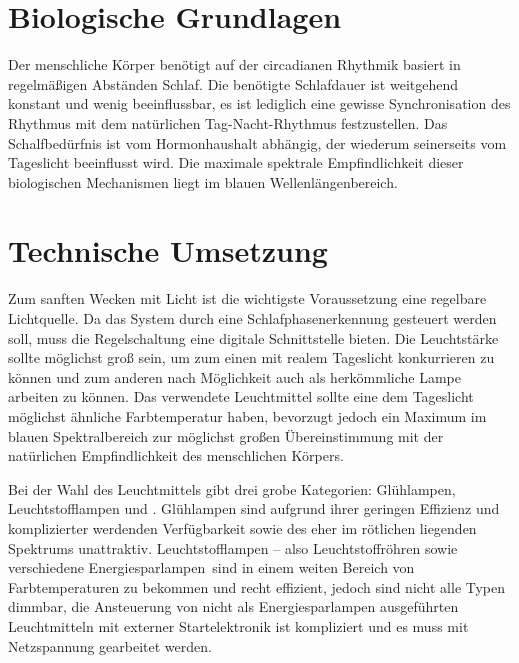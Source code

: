 \documentclass[12pt,a4paper,notitlepage]{article}
\begin{document}
\section{Biologische Grundlagen}
Der menschliche Körper benötigt auf der circadianen Rhythmik basiert in regelmäßigen Abständen Schlaf. Die benötigte Schlafdauer ist weitgehend konstant und wenig beeinflussbar, es ist lediglich eine gewisse Synchronisation des Rhythmus mit dem natürlichen Tag-Nacht-Rhythmus festzustellen. Das Schalfbedürfnis ist vom Hormonhaushalt abhängig\cite{WP9}, der wiederum seinerseits vom Tageslicht beeinflusst wird. Die maximale spektrale Empfindlichkeit dieser biologischen Mechanismen liegt im blauen Wellenlängenbereich.
\cite{WP5, WP6, WP7, WP8}

\section{Technische Umsetzung}
Zum sanften Wecken mit Licht ist die wichtigste Voraussetzung eine regelbare Lichtquelle. Da das System durch eine Schlafphasenerkennung gesteuert werden soll, muss die Regelschaltung eine digitale Schnittstelle bieten. Die Leuchtstärke sollte möglichst groß sein, um zum einen mit realem Tageslicht konkurrieren zu können und zum anderen nach Möglichkeit auch als herkömmliche Lampe arbeiten zu können. Das verwendete Leuchtmittel sollte eine dem Tageslicht möglichst ähnliche Farbtemperatur haben, bevorzugt jedoch ein Maximum im blauen Spektralbereich zur möglichst großen Übereinstimmung mit der natürlichen Empfindlichkeit des menschlichen Körpers.

Bei der Wahl des Leuchtmittels gibt drei grobe Kategorien: Glühlampen, Leuchtstofflampen und . Glühlampen sind aufgrund ihrer geringen Effizienz und komplizierter werdenden Verfügbarkeit sowie des eher im rötlichen liegenden Spektrums unattraktiv. Leuchtstofflampen -- also Leuchtstoffröhren sowie verschiedene \glqq Energiesparlampen\grqq\ sind in einem weiten Bereich von Farbtemperaturen zu bekommen und recht effizient, jedoch sind nicht alle Typen dimmbar, die Ansteuerung von nicht als Energiesparlampen ausgeführten Leuchtmitteln mit externer Startelektronik ist kompliziert und es muss mit Netzspannung gearbeitet werden.
\end{document}
